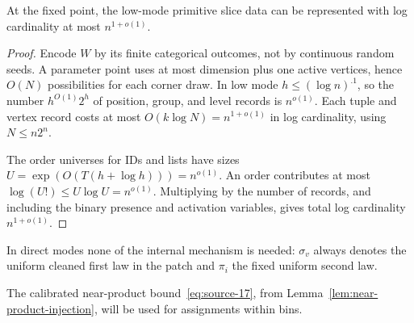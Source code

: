 \begin{lemma}\label{lem:finite-low-mode-data}
At the fixed point, the low-mode primitive slice data can be represented with log cardinality at most \(n^{1+o(1)}\).
\end{lemma}

\begin{proof}
Encode \(W\) by its finite categorical outcomes, not by continuous random seeds. A parameter point uses at most dimension plus one active vertices, hence \(O(N)\) possibilities for each corner draw. In low mode \(h\le(\log n)^{.1}\), so the number \(h^{O(1)}2^h\) of position, group, and level records is \(n^{o(1)}\). Each tuple and vertex record costs at most \(O(k\log N)=n^{1+o(1)}\) in log cardinality, using \(N\le n2^n\).

The order universes for IDs and lists have sizes
\(U=\exp(O(T(h+\log h)))=n^{o(1)}\). An order contributes at most \(\log(U!)\le U\log U=n^{o(1)}\). Multiplying by the number of records, and including the binary presence and activation variables, gives total log cardinality \(n^{1+o(1)}\).
\end{proof}

In direct modes none of the internal mechanism is needed: \(\sigma_v\) always denotes the uniform cleaned first law in the patch and \(\pi_i\) the fixed uniform second law.

The calibrated near-product bound~\eqref{eq:source-17}, from Lemma~\ref{lem:near-product-injection}, will be used for assignments within bins.
